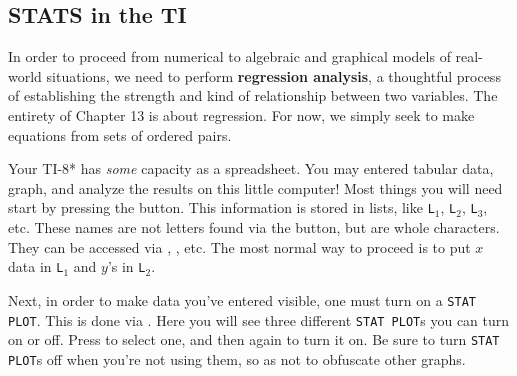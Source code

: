 
\subsection{STATS in the TI}



In order to proceed from numerical to algebraic and graphical models of
real-world situations, we need to perform \textbf{regression analysis}, a thoughtful
process of establishing the strength and kind of relationship between two
variables.  The entirety of Chapter 13 is about regression.
For now, we simply seek to make equations from sets of ordered pairs.

Your TI-8* has \emph{some} capacity as a spreadsheet.  You may entered tabular data, 
graph, and analyze the results on this little computer!  Most things you will need start by
pressing the \Touche[style=function,principal={stat},raise=-5pt] button.
This information is stored in lists, like \texttt{L$_1$}, \texttt{L$_2$}, \texttt{L$_3$}, etc.  
These names are not letters found via the \Touche[style=alpha]
button, but are whole characters.  They can be accessed via \Touche[style=second]
\Touche[style=number, principal=1,second=L1], \Touche[style=second] 
\Touche[style=number, principal=2,second=L2], etc.  The most normal way to proceed is to put $x$ 
data in \texttt{L$_1$} and $y$'s in \texttt{L$_2$}.


Next, in order to make data you've entered visible, one must turn on a \texttt{STAT PLOT}.
This is done via \Touche[style=second] 
\Touche[style=graph,principal={y=},position = 0.9,second={stat plot},raise=-7pt].
Here you will see three different \texttt{STAT PLOT}s you can turn on or off.  Press
\Touche[style=enter,principal=enter,raise=-5pt] to select one, and then again to turn it on.
Be sure to turn \texttt{STAT PLOT}s off when you're not using them, so as not to obfuscate
other graphs.

